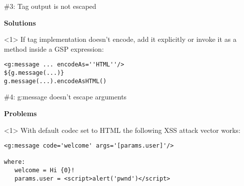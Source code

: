 \begin{frame}

  \vspace{.5cm}

  \begin{center}
    \Huge \#3: Tag output is not escaped
  \end{center}

  \vspace{1cm}

    \Large
    \textbf{Solutions} \\[1em]

    \begin{onlyenv}<1>
      If tag implementation doesn't encode, add it explicitly or invoke it as a method inside a GSP expression:
      \begin{center}
        \begin{minipage}{.9\textwidth}
          \begin{verbatim}
<g:message ... encodeAs=''HTML''/>
${g.message(...)}
g.message(...).encodeAsHTML()
          \end{verbatim}
        \end{minipage}
      \end{center}
    \end{onlyenv}

    \vfill

\end{frame}



\begin{frame}

  \vspace{.5cm}

  \begin{center}
    \Huge \#4: g:message doesn't escape arguments
  \end{center}

  \vspace{1cm}

    \Large
    \textbf{Problems} \\[1em]

    \begin{onlyenv}<1>
      With default codec set to HTML the following XSS attack vector works:
      \begin{center}
        \begin{minipage}{.9\textwidth}
          \begin{verbatim}
<g:message code='welcome' args='[params.user]'/>

where:
   welcome = Hi {0}!
   params.user = <script>alert('pwnd')</script>
          \end{verbatim}
        \end{minipage}
      \end{center}
    \end{onlyenv}

    \vfill

\end{frame}

